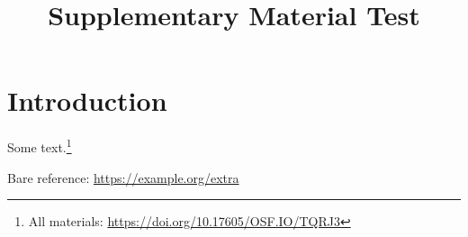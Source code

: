 \documentclass{ccr}
\title{Supplementary Material Test}
\providecommand{\supplementarymaterial}[1]{#1}
\begin{document}
\maketitle

\section{Introduction}
Some text.\footnote{\supplementarymaterial{All materials: \url{https://doi.org/10.17605/OSF.IO/TQRJ3}}}

\supplementarymaterial{Bare reference: \url{https://example.org/extra}}
\end{document}
